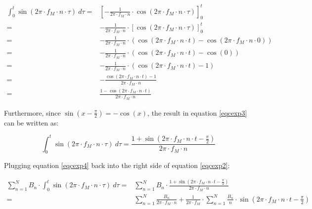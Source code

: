 \documentclass{article}
\begin{document}
    \begin{equation}\label{eqcexp3}
      \begin{split}
        \int_{0}^{t} \sin(2\pi \cdot f_M \cdot n \cdot \tau) \ d\tau
          = & \left[
                - \frac{1}{2\pi \cdot f_M \cdot n}
                \cdot \cos(2\pi \cdot f_M \cdot n \cdot \tau)
              \right]_0^t \\
          = & - \frac{1}{2\pi \cdot f_M \cdot n}
              \cdot \left[ \cos(2\pi \cdot f_M \cdot n \cdot \tau) \right]_0^t \\
          = & - \frac{1}{2\pi \cdot f_M \cdot n}
              \cdot (
                \cos(2\pi \cdot f_M \cdot n \cdot t)
                - \cos(2\pi \cdot f_M \cdot n \cdot 0)
              ) \\
          = & - \frac{1}{2\pi \cdot f_M \cdot n} \cdot (
                \cos(2\pi \cdot f_M \cdot n \cdot t) - \cos(0)
              ) \\
          = & - \frac{1}{2\pi \cdot f_M \cdot n} \cdot (
                \cos(2\pi \cdot f_M \cdot n \cdot t) - 1
              ) \\
          = & - \frac{
                \cos(2\pi \cdot f_M \cdot n \cdot t) - 1
              }{2\pi \cdot f_M \cdot n} \\
          = & \frac{
                1 - \cos(2\pi \cdot f_M \cdot n \cdot t)
              }{2\pi \cdot f_M \cdot n}
      \end{split}
    \end{equation}

    Furthermore, since $\sin(x-\frac{\pi}{2}) = -\cos(x)$, the result in
    equation \ref{eqcexp3} can be written as:

    \begin{equation}\label{eqcexp4}
      \int_{0}^{t} \sin(2\pi \cdot f_M \cdot n \cdot \tau) \ d\tau
        = \frac{
            1 + \sin \left( 2\pi \cdot f_M \cdot n \cdot t - \frac{\pi}{2} \right)
        }{2\pi \cdot f_M \cdot n}
    \end{equation}

    Plugging equation \ref{eqcexp4} back into the right side of equation
    \ref{eqcexp2}:

    \begin{equation}\label{eqcexp5}
      \begin{split}
        \sum_{n=1}^{N}
          B_n \cdot \int_{0}^{t} \sin(2\pi \cdot f_M \cdot n \cdot \tau) \ d\tau
            = & \sum_{n=1}^{N}
                  B_n \cdot \frac{1 + \sin \left(
                    2\pi \cdot f_M \cdot n \cdot t - \frac{\pi}{2}
                  \right)}{2\pi \cdot f_M \cdot n} \\
            = & \sum_{n=1}^{N}
                  \frac{B_n}{2\pi \cdot f_M \cdot n}
                  + \frac{1}{2\pi \cdot f_M} \cdot \sum_{n=1}^{N}
                      \frac{B_n}{n} \cdot \sin \left(
                        2\pi \cdot f_M \cdot n \cdot t - \frac{\pi}{2}
                      \right)
      \end{split}
    \end{equation}
\end{document}
